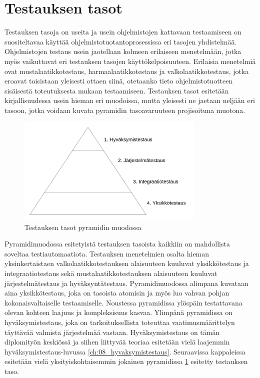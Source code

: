 \section{Testauksen tasot} \label{ch:07_testauksen_tasot}

Testauksen tasoja on useita ja usein ohjelmistojen kattavaan testaamiseen on suositeltavaa käyttää ohjelmistotuotantoprosessissa eri tasojen yhdistelmää.
Ohjelmistojen testaus usein jaotellaan kolmeen erilaiseen menetelmään, jotka myös vaikuttavat eri testauksen tasojen käyttökelpoisuuteen.
Erilaisia menetelmiä ovat mustalaatikkotestaus, harmaalaatikkotestaus ja valkolaatikkotestaus, jotka eroavat toisistaan yleisesti ottaen siinä, otetaanko tieto ohjelmistotuotteen sisäisestä toteutuksesta mukaan testaamiseen.
Testauksen tasot esitetään kirjallisuudessa usein hieman eri muodoissa, mutta yleisesti ne jaetaan neljään eri tasoon, jotka voidaan kuvata pyramidin tasoavaruuteen projisoituna muotona.

\begin{figure}[H]
  \centering
  \includegraphics[width=0.8\textwidth]{assets/testing-levels-pyramid.png}
  \caption{Testauksen tasot pyramidin muodossa}
  \label{fig:testing_levels_pyramid}
\end{figure}

Pyramidimuodossa esitetyistä testauksen tasoista kaikkiin on mahdollista soveltaa testiautomaatiota.
Testauksen menetelmien osalta hieman yksinkertaistaen valkolaatikkotestauksen alaisuuteen kuuluvat yksikkötestaus ja integraatiotestaus sekä mustalaatikkotestauksen alaisuuteen kuuluvat järjestelmätestaus ja hyväksyntätestaus.
Pyramidimuodossa alimpana kuvataan aina yksikkötestaus, joka on tasoista atomisin ja myös luo vahvan pohjan kokonaisvaltaiselle testaamiselle.
Noustessa pyramidissa ylöspäin testattavana olevan kohteen laajuus ja kompleksisuus kasvaa.
Ylimpänä pyramidissa on hyväksymistestaus, joka on tarkoituksellista toteuttaa vaatimusmäärittelyn täyttävää valmista järjestelmää vastaan.
Hyväksymistestaus on tämän diplomityön keskiössä ja siihen liittyvää teoriaa esitetään vielä laajemmin hyväksymistestaus-luvussa \ref{ch:08_hyvaksymistestaus}.
Seuraavissa kappaleissa esitetään vielä yksityiskohtaisemmin jokainen pyramidissa \ref{fig:testing_levels_pyramid} esitetty testauksen taso.

